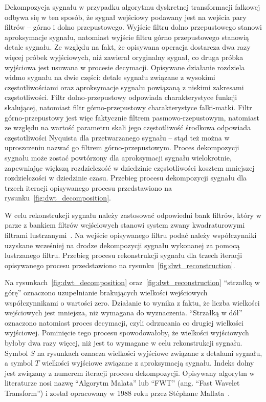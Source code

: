 Dekompozycja sygnału w przypadku algorytmu dyskretnej transformacji falkowej odbywa się w ten sposób, że sygnał wejściowy podawany jest na wejścia pary filtrów -- górno i dolno przepustowego. Wyjście filtru dolno przepustowego stanowi aproksymacje sygnału, natomiast wyjście filtru górno przepustowego stanowią detale sygnału. Ze względu na fakt, że opisywana operacja dostarcza dwa razy więcej próbek wyjściowych, niż zawierał oryginalny sygnał, co druga próbka wyjściowa jest usuwana w procesie decymacji. Opisywane działanie rozdziela widmo sygnału na dwie części: detale sygnału związane z wysokimi częstotliwościami oraz aproksymacje sygnału powiązaną z niskimi zakresami częstotliwości. Filtr dolno-przepustowy odpowiada charakterystyce funkcji skalującej, natomiast filtr górno-przepustowy charakterystyce falki-matki. Filtr górno-przepustowy jest więc faktycznie filtrem pasmowo-rzepustowym, natomiast ze względu na wartość parametru skali jego częstotliwość środkowa odpowiada częstotliwości Nyquista dla przetwarzanego sygnału -- stąd też można w uproszczeniu nazwać go filtrem górno-przepustowym. Proces dekompozycji sygnału może zostać powtórzony dla aproksymacji sygnału wielokrotnie, zapewniając większą rozdzielczość w dziedzinie częstotliwości kosztem mniejszej rozdzielczości w dziedzinie czasu. Przebieg procesu dekompozycji sygnału dla trzech iteracji opisywanego procesu przedstawiono na rysunku~\ref{fig:dwt_decomposition}.

W celu rekonstrukcji sygnału należy zastosować odpowiedni bank filtrów, który w parze z bankiem filtrów wejściowych stanowi system zwany kwadraturowymi filtrami lustrzanymi~\cite{johnston_filter}. Na wejście opisywanego filtru podać należy współczynniki uzyskane wcześniej na drodze dekompozycji sygnału wykonanej za pomocą lustrzanego filtru. Przebieg procesu rekonstrukcji sygnału dla trzech iteracji opisywanego procesu przedstawiono na rysunku~\ref{fig:dwt_reconstruction}.

Na rysunkach~\ref{fig:dwt_decomposition} oraz~\ref{fig:dwt_reconstruction} \enquote{strzałką w górę} oznaczono uzupełnianie brakujących wielkości wejściowych współczynnikami o wartości zero. Działanie to wynika z faktu, że liczba wielkości wejściowych jest mniejsza, niż wymagana do wyznaczenia. \enquote{Strzałką w dół} oznaczono natomiast proces decymacji, czyli odrzucania co drugiej wielkości wyjściowej. Pominięcie tego procesu spowodowałoby, że wielkości wyjściowych byłoby dwa razy więcej, niż jest to wymagane w celu rekonstrukcji sygnału. Symbol $S$ na rysunkach oznacza wielkości wyjściowe związane z detalami sygnału, a symbol $T$ wielkości wyjściowe związane z aproksymacją sygnału. Indeks dolny jest związany z numerem iteracji procesu dekompozycji. Opisywany algorytm w literaturze nosi nazwę \enquote{Algorytm Malata} lub \enquote{FWT} (ang. \enquote{Fast Wavelet Transform}) i został opracowany w 1988 roku przez Stéphane Mallata~\cite{lujian_mallat}.

